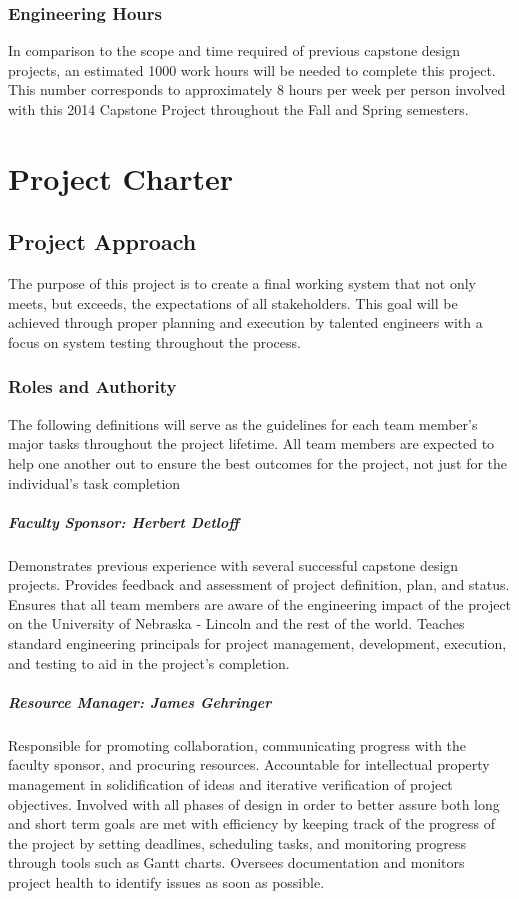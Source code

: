 \subsection{Engineering Hours}
In comparison to the scope and time required of previous capstone design projects, an estimated 1000 work hours will be needed to complete this project.
This number corresponds to approximately 8 hours per week per person involved with this 2014 Capstone Project throughout the Fall and Spring semesters.

\chapter{Project Charter}
\section{Project Approach}
The purpose of this project is to create a final working system that not only meets, but exceeds, the expectations of all stakeholders. This goal will be achieved through proper planning and execution by talented engineers with a focus on system testing throughout the process.

\subsection{Roles and Authority}
The following definitions will serve as the guidelines for each team member's major tasks throughout the project lifetime. All team members are expected to help one another out to ensure the best outcomes for the project, not just for the individual's task completion
\paragraph{Faculty Sponsor: Herbert Detloff}
Demonstrates previous experience with several successful capstone design projects.
Provides feedback and assessment of project definition, plan, and status.
Ensures that all team members are aware of the engineering impact of the project on the University of Nebraska - Lincoln and the rest of the world.
Teaches standard engineering principals for project management, development, execution, and testing to aid in the project's completion.

\paragraph{Resource Manager: James Gehringer}
Responsible for promoting collaboration, communicating progress with the faculty sponsor, and procuring resources.
Accountable for intellectual property management in solidification of ideas and iterative verification of project objectives.
Involved with all phases of design in order to better assure both long and short term goals are met with efficiency by keeping track of the progress of the project by setting deadlines, scheduling tasks, and monitoring progress through tools such as Gantt charts.
Oversees documentation and monitors project health to identify issues as soon as possible.

